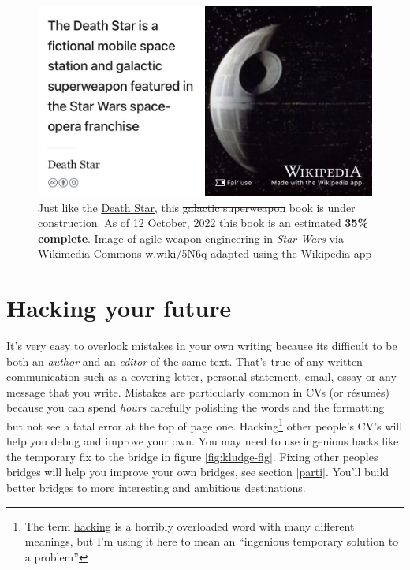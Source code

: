 \documentclass[
]{book}
\begin{document}
\begin{figure}

{\centering \includegraphics[width=0.99\linewidth]{images/DeathStar2} 

}

\caption{Just like the \href{https://en.wikipedia.org/wiki/Death_Star}{Death Star}, this \sout{galactic superweapon} book is under construction. As of 12 October, 2022 this book is an estimated \textbf{35\% complete}. Image of agile weapon engineering in \emph{Star Wars} via Wikimedia Commons \href{https://w.wiki/5N6q}{w.wiki/5N6q} adapted using the \href{https://apps.apple.com/gb/app/wikipedia/id324715238}{Wikipedia app}}\label{fig:deathstar19-fig}
\end{figure}

\hypertarget{hacking}{%
\chapter{Hacking your future}\label{hacking}}

It's very easy to overlook mistakes in your own writing because its difficult to be both an \emph{author} and an \emph{editor} of the same text. That's true of any written communication such as a covering letter, personal statement, email, essay or any message that you write. Mistakes are particularly common in CVs (or résumés) because you can spend \emph{hours} carefully polishing the words and the formatting but not see a fatal error at the top of page one. Hacking\footnote{The term \href{https://en.wikipedia.org/wiki/Hacker_(disambiguation)}{hacking} is a horribly overloaded word with many different meanings, but I'm using it here to mean an ``ingenious temporary solution to a problem''} other people's CV's will help you debug and improve your own. You may need to use ingenious hacks like the temporary fix to the bridge in figure \ref{fig:kludge-fig}. Fixing other peoples bridges will help you improve your own bridges, see section \ref{parti}. You'll build better bridges to more interesting and ambitious destinations.
\end{document}
